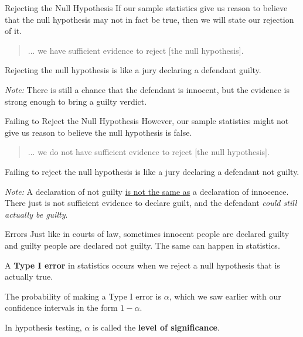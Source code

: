 \documentclass[t]{beamer}
\begin{document}
\begin{frame}{Rejecting the Null Hypothesis}
If our sample statistics give us reason to believe that the null hypothesis may not in fact be true, then we will state our rejection of it.	\newline\\	\pause

\begin{quote}
... we have sufficient evidence to reject [the null hypothesis].
\end{quote}	\bigskip		\pause

Rejecting the null hypothesis is like a jury declaring a defendant guilty. \newline\\	\pause

\emph{Note:} There is still a chance that the defendant is innocent, but the evidence is strong enough to bring a guilty verdict.
\end{frame}

\begin{frame}{Failing to Reject the Null Hypothesis}
However, our sample statistics might not give us reason to believe the null hypothesis is false. \newline\\	\pause

\begin{quote}
... we do not have sufficient evidence to reject [the null hypothesis].
\end{quote}	\bigskip \pause

Failing to reject the null hypothesis is like a jury declaring a defendant not guilty.	\newline\\	\pause

\emph{Note:} A declaration of not guilty \underline{is not the same as} a declaration of innocence. There just is not sufficient evidence to declare guilt, and the defendant \emph{could still actually be guilty}.
\end{frame}

\begin{frame}{Errors}
Just like in courts of law, sometimes innocent people are declared guilty and guilty people are declared not guilty. The same can happen in statistics.	\newline\\	\pause

\begin{tcolorbox}[colframe=green!20!black, colback = green!30!white,title={\textbf{Type I Error}}]
A \textbf{Type I error} in statistics occurs when we reject a null hypothesis that is actually true.
\end{tcolorbox}
\bigskip \pause

The probability of making a Type I error is $\alpha$, which we saw earlier with our confidence intervals in the form $1-\alpha$.	\newline\\	\pause

In hypothesis testing, $\alpha$ is called the \textbf{level of significance}.
\end{frame}
\end{document}
